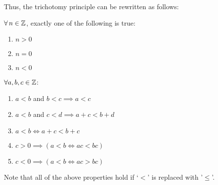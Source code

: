 \documentclass[letterpaper,12pt,fleqn]{article}
\begin{document}
Thus, the trichotomy principle can be rewritten as follows:

$\forall\,n\in\mathbb{Z}$, exactly one of the following is true:
\begin{enumerate}
\item $n>0$
\item $n=0$
\item $n<0$
\end{enumerate}
\newpage
\begin{properties}
  $\forall a,b,c\in\mathbb{Z}$:
  \begin{enumerate}
  \item $a<b$ and $b<c\implies a<c$
  \item $a<b$ and $c<d\implies a+c<b+d$
  \item $a<b\iff a+c<b+c$
  \item $c>0\implies\left(a<b\iff ac<bc\right)$
  \item $c<0\implies\left(a<b\iff ac>bc\right)$
  \end{enumerate}
\end{properties}

Note that all of the above properties hold if `$<$' is replaced with '$\le$'.
\end{document}
